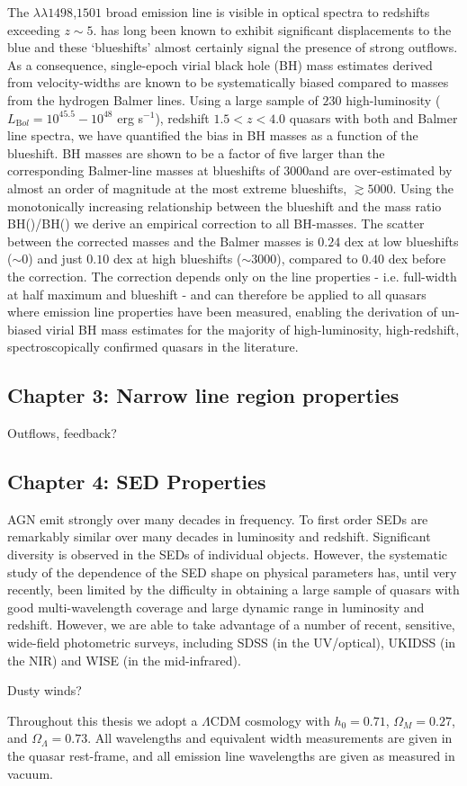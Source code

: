 The $\lambda\lambda$$1498$,$1501$ broad emission line is visible in optical spectra to redshifts exceeding $z\sim5$. 
 has long been known to exhibit significant displacements to the blue and these `blueshifts' almost certainly signal the presence of strong outflows.
As a consequence, single-epoch virial black hole (BH) mass estimates derived from  velocity-widths are known to be systematically biased compared to masses from the hydrogen Balmer lines. 
Using a large sample of $230$ high-luminosity ($L_{\mathrm Bol} = 10^{45.5}-10^{48}$ erg s$^{-1}$), redshift $1.5 < z < 4.0$ quasars with both  and Balmer line spectra, we have quantified the bias in  BH masses as a function of the  blueshift. 
 BH masses are shown to be a factor of five larger than the corresponding Balmer-line masses at  blueshifts of $3000$\kms and are over-estimated by almost an order of magnitude at the most extreme blueshifts, $\gtrsim 5000$\kms.
Using the monotonically increasing relationship between the  blueshift and the mass ratio BH()/BH(\hans) we derive an empirical correction to all  BH-masses.
The scatter between the corrected  masses and the Balmer masses is $0.24$ dex at low  blueshifts ($\sim0$\kms) and just $0.10$ dex at high blueshifts ($\sim3000$\kms), compared to $0.40$ dex before the correction. 
The correction depends only on the  line properties - i.e. full-width at half maximum and blueshift - and can therefore be applied to all quasars where  emission line properties have been measured, enabling the derivation of un-biased virial BH mass estimates for the majority of high-luminosity, high-redshift, spectroscopically confirmed quasars in the literature.

\subsection{Chapter 3: Narrow line region properties}

Outflows, feedback? 

\subsection{Chapter 4: SED Properties}

AGN emit strongly over many decades in frequency. 
To first order SEDs are remarkably similar over many decades in luminosity and redshift. 
Significant diversity is observed in the SEDs of individual objects. 
However, the systematic study of the dependence of the SED shape on physical parameters has, until very recently, been limited by the difficulty in obtaining a large sample of quasars with good multi-wavelength coverage and large dynamic range in luminosity and redshift. 
However, we are able to take advantage of a number of recent, sensitive, wide-field photometric surveys, including SDSS (in the UV/optical), UKIDSS (in the NIR) and WISE (in the mid-infrared).

Dusty winds?

Throughout this thesis we adopt a $\Lambda$CDM cosmology with $h_0=0.71$, $\Omega_M=0.27$, and $\Omega_\Lambda=0.73$. 
All wavelengths and equivalent width measurements are given in the quasar rest-frame, and all emission line wavelengths are given as measured in vacuum.
